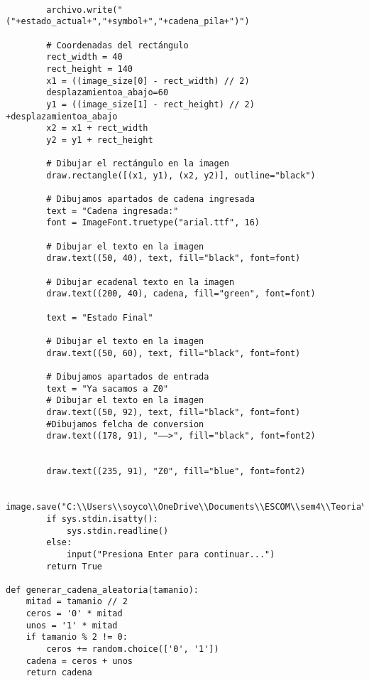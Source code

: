 \begin{lstlisting}
            
        archivo.write("("+estado_actual+","+symbol+","+cadena_pila+")")    
        
        # Coordenadas del rectángulo
        rect_width = 40
        rect_height = 140
        x1 = ((image_size[0] - rect_width) // 2)
        desplazamientoa_abajo=60
        y1 = ((image_size[1] - rect_height) // 2) +desplazamientoa_abajo
        x2 = x1 + rect_width
        y2 = y1 + rect_height
        
        # Dibujar el rectángulo en la imagen
        draw.rectangle([(x1, y1), (x2, y2)], outline="black")
        
        # Dibujamos apartados de cadena ingresada
        text = "Cadena ingresada:"
        font = ImageFont.truetype("arial.ttf", 16)

        # Dibujar el texto en la imagen
        draw.text((50, 40), text, fill="black", font=font)
        
        # Dibujar ecadenal texto en la imagen 
        draw.text((200, 40), cadena, fill="green", font=font) 
        
        text = "Estado Final"

        # Dibujar el texto en la imagen
        draw.text((50, 60), text, fill="black", font=font)
        
        # Dibujamos apartados de entrada
        text = "Ya sacamos a Z0"
        # Dibujar el texto en la imagen
        draw.text((50, 92), text, fill="black", font=font)
        #Dibujamos felcha de conversion
        draw.text((178, 91), "——>", fill="black", font=font2)
                
        
        draw.text((235, 91), "Z0", fill="blue", font=font2)
        
        image.save("C:\\Users\\soyco\\OneDrive\\Documents\\ESCOM\\sem4\\Teoria\\P2\\Prog4\\output\\animacion.png")
        if sys.stdin.isatty():
            sys.stdin.readline()
        else:
            input("Presiona Enter para continuar...")
        return True    

def generar_cadena_aleatoria(tamanio):
    mitad = tamanio // 2
    ceros = '0' * mitad
    unos = '1' * mitad
    if tamanio % 2 != 0:
        ceros += random.choice(['0', '1'])
    cadena = ceros + unos
    return cadena
    

\end{lstlisting}
